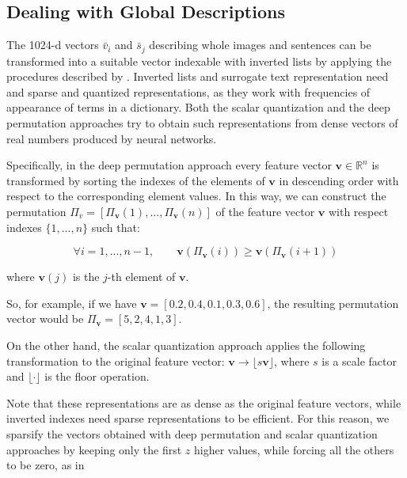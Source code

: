 \documentclass[conference]{IEEEtran}
\begin{document}
\subsection{Dealing with Global Descriptions}
The 1024-d vectors $\bar{v}_i$ and $\bar{s}_j$ describing whole images and sentences can be transformed into a suitable vector indexable with inverted lists by applying the procedures described by \cite{amato2016deeppermutations,amato2019large}.
Inverted lists and surrogate text representation need and sparse and quantized representations, as they work with frequencies of appearance of terms in a dictionary. Both the scalar quantization and the deep permutation approaches try to obtain such representations from dense vectors of real numbers produced by neural networks.

Specifically, in the deep permutation approach every feature vector $\boldsymbol{v} \in \mathbb{R}^n$ is transformed by sorting the indexes
of the elements of $\boldsymbol{v}$ in descending order with respect to the corresponding element values. In this way, we can construct the permutation $\Pi_{{v}} = [\Pi_{\boldsymbol{v}}(1),...,\Pi_{\boldsymbol{v}}(n)]$ of the feature vector $\boldsymbol{v}$ with respect indexes $\{1,...,n\}$ such that:

\begin{equation}
\forall i = 1,...,n-1, \qquad \boldsymbol{v}(\Pi_{\boldsymbol{v}}(i)) \geq \boldsymbol{v}(\Pi_{\boldsymbol{v}}(i + 1))
\end{equation}

where $\boldsymbol{v}(j)$ is the $j$-th element of $\boldsymbol{v}$.

So, for example, if we have $\boldsymbol{v} = [0.2, 0.4, 0.1, 0.3, 0.6]$, the resulting permutation vector would be $\Pi_{\boldsymbol{v}} = [5, 2, 4, 1, 3]$.

On the other hand, the scalar quantization approach applies the following transformation to the original feature vector: $\boldsymbol{v} \rightarrow \lfloor s\boldsymbol{v}\rfloor$, where $s$ is a scale factor and $\lfloor \cdot \rfloor$ is the floor operation.

Note that these representations are as dense as the original feature vectors, while inverted indexes need sparse representations to be efficient. %
For this reason, we sparsify the vectors obtained with deep permutation and scalar quantization approaches by keeping only the first $z$ higher values, while forcing all the others to be zero, as in \cite{amato2019large}
\end{document}
